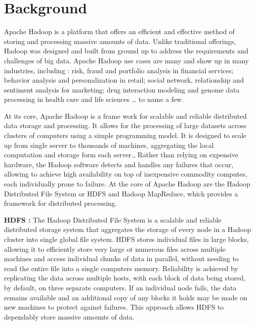\section{Background}
\par Apache Hadoop \cite{Hadoop2009} is a platform that offers an efficient and effective method of storing and processing massive amounts of data. Unlike traditional offerings, Hadoop was designed and built from ground up to address the requirements and challenges of big data. Apache Hadoop use cases are many and show up in many industries, including : risk, fraud and portfolio analysis in financial services; behavior analysis and personalization in retail; social network, relationship and sentiment analysis for marketing; drug interaction modeling and genome data processing in health care and life sciences … to name a few.
\par At its core, Apache Hadoop is a frame work for scalable and reliable distributed data storage and processing. It allows for the processing of large datasets across clusters of computers using a simple programming model. It is designed to scale up from single server to thousands of machines, aggregating the local computation and storage form each server., Rather than relying on expensive hardware, the Hadoop software detects and handles any failures that occur, allowing to achieve high availability on top of inexpensive commodity computes, each individually prone to failure.
At the core of Apache Hadoop are the Hadoop Distributed File System or HDFS and Hadoop MapReduce, which provides a framework for distributed processing.
\par \textbf{HDFS :} The Hadoop Distributed File System \cite{Shvachko2010} is a scalable and reliable distributed storage system that aggregates the storage of every node in a Hadoop cluster into single global file system. HDFS stores individual files in large blocks, allowing it to efficiently store very large ot numerous files across multiple machines and access individual chunks of data in parallel, without needing to read the entire file into a single computers memory. Reliability is achieved by replicating the data across multiple hosts, with each block of data being stored, by default, on three separate computers. If an individual node fails, the data remains available and an additional copy of any blocks it holds may be made on new machines to protect against failures. This approach allows HDFS to dependably store massive amounts of data.
